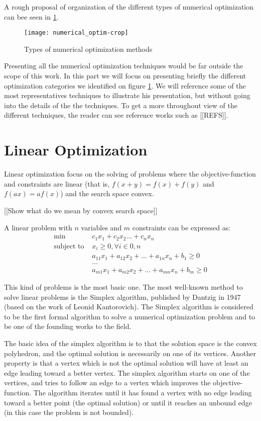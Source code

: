 A rough proposal of organization of the different types of numerical optimization can bee seen in \ref{numerical_optim_tree}.

\begin{figure}
\texttt{[image: numerical\_optim-crop]}
\caption{Types of numerical optimization methods}
\label{numerical_optim_tree}
\end{figure}

Presenting all the numerical optimization techniques would be far outside the scope of this work. In this part we will focus on presenting briefly the different optimization categories we identified on figure \ref{numerical_optim_tree}. We will reference some of the most representatives techniques to illustrate his presentation, but without going into the details of the the techniques. To get a more throughout view of the different techniques, the reader can see reference works such as [[REFS]].

\section{Linear Optimization}\label{linear_optim}

Linear optimization focus on the solving of problems where the objective-function and constraints are linear (that is, $f(x+y) = f(x)+f(y)$ and $f(ax) = af(x)$) and the search space convex.

[[Show what do we mean by convex search space]]

A linear problem with $n$ variables and $m$ constraints can be expressed as:
\begin{align*}
\text{min } & c_1x_1 + c_2x_2... + c_nx_n\\
\text{subject to } &x_i \geq 0, \forall i \in 0,n\\
&a_{11}x_1 + a_{12}x_2 + ... + a_{1n}x_n + b_1 \geq 0\\
&...\\
&a_{m1}x_1 + a_{m2}x_2 + ... + a_{mn}x_n + b_m \geq 0
\end{align*}

This kind of problems is the most basic one. The most well-known method to solve linear problems is the Simplex algorithm\cite{dantzig1998linear}, published by Dantzig in 1947 (based on the work of Leonid Kantorovich). The Simplex algorithm is considered to be the first formal algorithm to solve a numerical optimization problem and to be one of the founding works to the field.

The basic idea of the simplex algorithm is to that the solution space is the convex polyhedron, and the optimal solution is necessarily on one of its vertices. Another property is that a vertex which is not the optimal solution will have at least an edge leading toward a better vertex.
The simplex algorithm starts on one of the vertices, and tries to follow an edge to a vertex which improves the objective-function. The algorithm iterates until it has found a vertex with no edge leading toward a better point (the optimal solution) or until it reaches an unbound edge (in this case the problem is not bounded).

